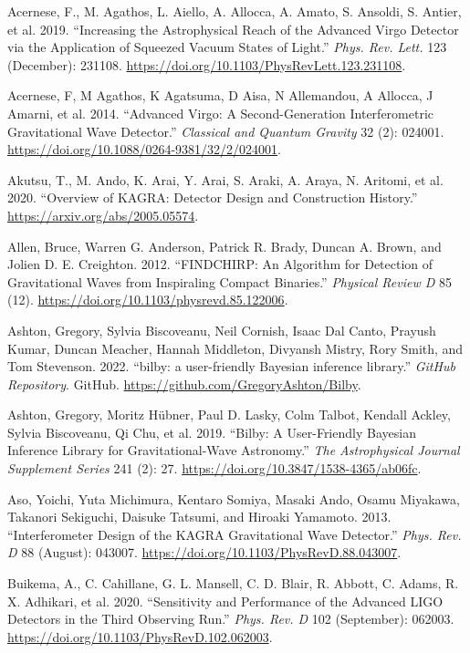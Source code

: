 \documentclass[10pt,a4paper,onecolumn]{article}
\newlength{\cslhangindent}
\newenvironment{CSLReferences}[3] %
 {%
  \setlength{\parindent}{0pt}
  \ifodd #1 \everypar{\setlength{\hangindent}{\cslhangindent}}\ignorespaces\fi
  \ifnum #2 > 0
  \setlength{\parskip}{#2\baselineskip}
  \fi
 }%
 {}
\begin{document}
\begin{CSLReferences}{1}{0}
\bibitem[\citeproctext]{ref-VIRGO:2019}
Acernese, F., M. Agathos, L. Aiello, A. Allocca, A. Amato, S. Ansoldi,
S. Antier, et al. 2019. {``Increasing the Astrophysical Reach of the
Advanced Virgo Detector via the Application of Squeezed Vacuum States of
Light.''} \emph{Phys. Rev. Lett.} 123 (December): 231108.
\url{https://doi.org/10.1103/PhysRevLett.123.231108}.

Acernese, F, M Agathos, K Agatsuma, D Aisa, N Allemandou, A Allocca, J
Amarni, et al. 2014. {``Advanced Virgo: A Second-Generation
Interferometric Gravitational Wave Detector.''} \emph{Classical and
Quantum Gravity} 32 (2): 024001.
\url{https://doi.org/10.1088/0264-9381/32/2/024001}.

Akutsu, T., M. Ando, K. Arai, Y. Arai, S. Araki, A. Araya, N. Aritomi,
et al. 2020. {``Overview of KAGRA: Detector Design and Construction
History.''} \url{https://arxiv.org/abs/2005.05574}.

Allen, Bruce, Warren G. Anderson, Patrick R. Brady, Duncan A. Brown, and
Jolien D. E. Creighton. 2012. {``FINDCHIRP: An Algorithm for Detection
of Gravitational Waves from Inspiraling Compact Binaries.''}
\emph{Physical Review D} 85 (12).
\url{https://doi.org/10.1103/physrevd.85.122006}.

Ashton, Gregory, Sylvia Biscoveanu, Neil Cornish, Isaac Dal Canto,
Prayush Kumar, Duncan Meacher, Hannah Middleton, Divyansh Mistry, Rory
Smith, and Tom Stevenson. 2022. {``{bilby: a user-friendly Bayesian
inference library}.''} \emph{GitHub Repository}. GitHub.
\url{https://github.com/GregoryAshton/Bilby}.

Ashton, Gregory, Moritz Hübner, Paul D. Lasky, Colm Talbot, Kendall
Ackley, Sylvia Biscoveanu, Qi Chu, et al. 2019. {``Bilby: A
User-Friendly Bayesian Inference Library for Gravitational-Wave
Astronomy.''} \emph{The Astrophysical Journal Supplement Series} 241
(2): 27. \url{https://doi.org/10.3847/1538-4365/ab06fc}.

Aso, Yoichi, Yuta Michimura, Kentaro Somiya, Masaki Ando, Osamu
Miyakawa, Takanori Sekiguchi, Daisuke Tatsumi, and Hiroaki Yamamoto.
2013. {``Interferometer Design of the KAGRA Gravitational Wave
Detector.''} \emph{Phys. Rev. D} 88 (August): 043007.
\url{https://doi.org/10.1103/PhysRevD.88.043007}.

Buikema, A., C. Cahillane, G. L. Mansell, C. D. Blair, R. Abbott, C.
Adams, R. X. Adhikari, et al. 2020. {``Sensitivity and Performance of
the Advanced LIGO Detectors in the Third Observing Run.''} \emph{Phys.
Rev. D} 102 (September): 062003.
\url{https://doi.org/10.1103/PhysRevD.102.062003}.


\end{CSLReferences}
\end{document}
